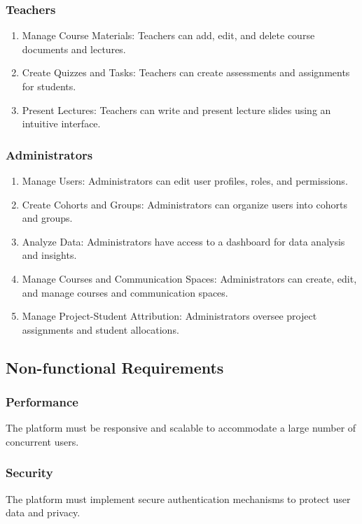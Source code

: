 \documentclass{IEEEtran}
\begin{document}
\subsubsection{Teachers}
\begin{enumerate}[noitemsep]
\item Manage Course Materials: Teachers can add, edit, and delete course documents and lectures.
\item Create Quizzes and Tasks: Teachers can create assessments and assignments for students.
\item Present Lectures: Teachers can write and present lecture slides using an intuitive interface.
\end{enumerate}

\subsubsection{Administrators}
\begin{enumerate}[noitemsep]
\item Manage Users: Administrators can edit user profiles, roles, and permissions.
\item Create Cohorts and Groups: Administrators can organize users into cohorts and groups.
\item Analyze Data: Administrators have access to a dashboard for data analysis and insights.
\item Manage Courses and Communication Spaces: Administrators can create, edit, and manage courses and communication spaces.
\item Manage Project-Student Attribution: Administrators oversee project assignments and student allocations.
\end{enumerate}

\subsection{Non-functional Requirements}
\subsubsection{Performance}
The platform must be responsive and scalable to accommodate a large number of concurrent users.

\subsubsection{Security}
The platform must implement secure authentication mechanisms to protect user data and privacy.
\end{document}
